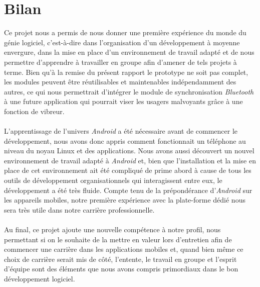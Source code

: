 \chapter*{Bilan}

Ce projet nous a permis de nous donner une première expérience du monde du génie logiciel, c'est-à-dire dans l'organisation d'un développement à moyenne envergure, dans la mise en place d'un environnement de travail adapté et de nous permettre d'apprendre à travailler en groupe afin d'amener de tels projets à terme. Bien qu'à la remise du présent rapport le prototype ne soit pas complet, les modules peuvent être réutilisables et maintenables indépendamment des autres, ce qui nous permettrait d'intégrer le module de synchronisation \textit{Bluetooth} à une future application qui pourrait viser les usagers malvoyants grâce à une fonction de vibreur. \\
\\
L'apprentissage de l'univers \textit{Android} a été nécessaire avant de commencer le développement, nous avons donc appris comment fonctionnait un téléphone au niveau du noyau Linux et des applications.
Nous avons aussi découvert un nouvel environnement de travail adapté à \textit{Android} et, bien que l'installation et la mise en place de cet environnement ait été compliqué de prime abord à cause de tous les outils de développement organisationnels qui interagissent entre eux, le développement a été très fluide. Compte tenu de la prépondérance d'\textit{Android} sur les appareils mobiles, notre première expérience avec la plate-forme dédié nous sera très utile dans notre carrière professionnelle. \\
\\
Au final, ce projet ajoute une nouvelle compétence à notre profil, nous permettant si on le souhaite de la mettre en valeur lors d'entretien afin de commencer une carrière dans les applications mobiles et, quand bien même ce choix de carrière serait mis de côté, l'entente, le travail en groupe et l'esprit d'équipe sont des éléments que nous avons compris primordiaux dans le bon développement logiciel.